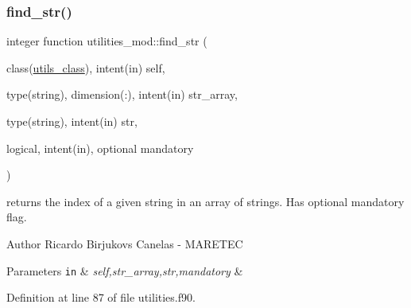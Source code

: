 \mbox{\label{namespaceutilities__mod_ad446cce78a6509db0e839439a0e84564}} 
\subsubsection{\texorpdfstring{find\+\_\+str()}{find\_str()}}
{\footnotesize\ttfamily integer function utilities\+\_\+mod\+::find\+\_\+str (\begin{DoxyParamCaption}\item[{class(\mbox{\hyperlink{structutilities__mod_1_1utils__class}{utils\+\_\+class}}), intent(in)}]{self,  }\item[{type(string), dimension(\+:), intent(in)}]{str\+\_\+array,  }\item[{type(string), intent(in)}]{str,  }\item[{logical, intent(in), optional}]{mandatory }\end{DoxyParamCaption})\hspace{0.3cm}{\ttfamily [private]}}



returns the index of a given string in an array of strings. Has optional mandatory flag. 

\begin{DoxyAuthor}{Author}
Ricardo Birjukovs Canelas -\/ M\+A\+R\+E\+T\+EC 
\end{DoxyAuthor}

\begin{DoxyParams}[1]{Parameters}
\mbox{\tt in}  & {\em self,str\+\_\+array,str,mandatory} & \\
\hline
\end{DoxyParams}


Definition at line 87 of file utilities.\+f90.


